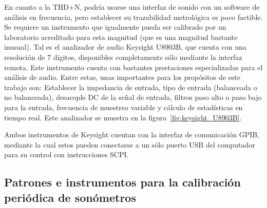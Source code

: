 En cuanto a la THD+N, podría usarse una interfaz de sonido con un software de análisis en frecuencia, pero establecer su trazabilidad metrológica es poco factible.
Se requiere un instrumento que igualmente pueda ser calibrado por un laboratorio acreditado para esta magnitud (que es una magnitud bastante inusual).
Tal es el analizador de audio Keysight U8903B, que cuenta con una resolución de $7$ dígitos, disponibles completamente sólo mediante la interfaz remota.
Este instrumento cuenta con bastantes prestaciones especializadas para el análisis de audio.
Entre estas, unas importantes para los propósitos de este trabajo son: Establecer la impedancia de entrada, tipo de entrada (balanceada o no balanceada), desacople DC de la señal de entrada, filtros paso alto o paso bajo para la entrada, frecuencia de muestreo variable y cálculo de estadísticas en tiempo real.
Este analizador se muestra en la figura~\ref{fig:keysight_U8903B}.

Ambos instrumentos de Keysight cuentan con la interfaz de comunicación GPIB, mediante la cual estos pueden conectarse a un sólo puerto USB del computador para su control con instrucciones SCPI\@.

\subsection{Patrones e instrumentos para la calibración periódica de sonómetros}

